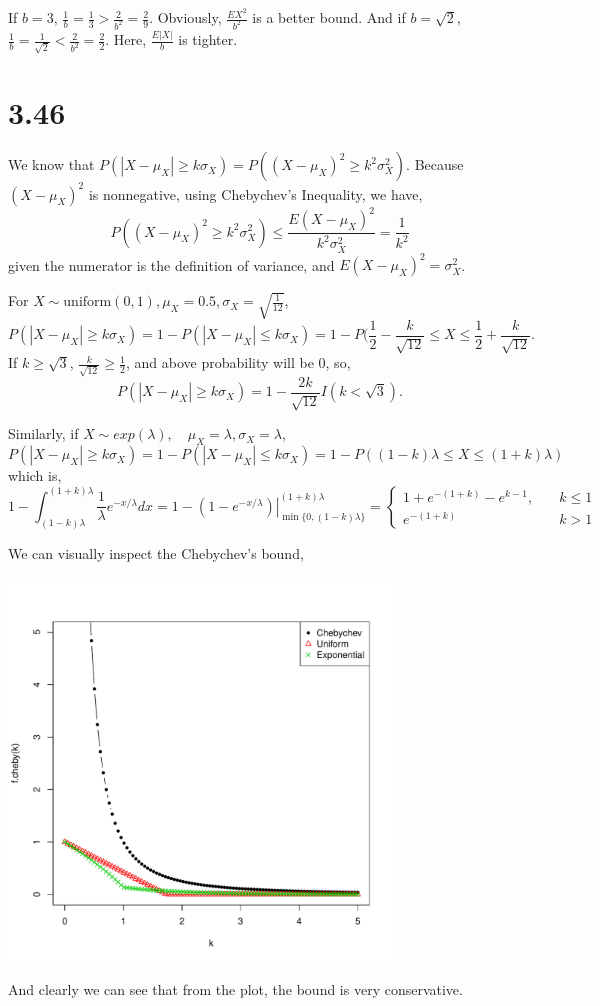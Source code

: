 \documentclass[letterpaper]{article}
\begin{document}
   If $b=3$, $\frac{1}{b} = \frac{1}{3} > \frac{2}{b^2} = \frac{2}{9}$. Obviously, $\frac{EX^2}{b^2}$ is a better bound. And if $b = \sqrt{2}$, $\frac{1}{b} = \frac{1}{\sqrt{2}} < \frac{2}{b^2} = \frac{2}{2}$. Here, $\frac{E|X|}{b}$ is tighter.

   \section*{3.46}
    We know that $P(|X-\mu_X| \ge k\sigma_X) = P\left((X-\mu_X)^2 \ge k^2 \sigma_X^2\right)$. Because $(X-\mu_X)^2$ is nonnegative, using Chebychev's Inequality, we have,
    \[
    P\left((X-\mu_X)^2 \ge k^2 \sigma_X^2\right) \le \frac{E(X-\mu_X)^2}{k^2 \sigma_X^2} = \frac{1}{k^2}
    \]
    given the numerator is the definition of variance, and $E(X - \mu_X)^2 = \sigma_X^2$.

    For $X \sim \text{uniform}(0, 1), \mu_X = 0.5, \sigma_X = \sqrt{\frac{1}{12}}$, 
    \[
    P(|X-\mu_X| \ge k\sigma_X) = 1 - P(|X - \mu_X| \le k\sigma_X) = 1 - P(\frac{1}{2}-\frac{k}{\sqrt{12}} \le X \le \frac{1}{2} + \frac{k}{\sqrt{12}}.
    \]
    If $k \ge \sqrt{3}$, $\frac{k}{\sqrt{12}} \ge \frac{1}{2}$, and above probability will be 0, so,
    \[
    P(|X-\mu_X| \ge k\sigma_X) = 1-\frac{2k}{\sqrt{12}} I(k < \sqrt{3}).
    \]

    Similarly, if $X \sim exp(\lambda), \quad \mu_X = \lambda, \sigma_X = \lambda$, 
    \[
    P(|X-\mu_X| \ge k\sigma_X) = 1 - P(|X - \mu_X| \le k\sigma_X) = 1-P((1-k)\lambda \le X \le (1+k)\lambda)
    \]
    which is,
    \[
    1- \int_{(1-k)\lambda}^{(1+k)\lambda} \frac{1}{\lambda} e^{-x/\lambda} dx = 1-\left.\left( 1-e^{-x/\lambda} \right)\right|^{(1+k)\lambda}_{\min\{0, (1-k)\lambda\}} = 
    \begin{cases}
    1+e^{-(1+k)}-e^{k-1}, \quad & k \le 1 \\
    e^{-(1+k)} \quad & k > 1
    \end{cases}
    \]

    We can visually inspect the Chebychev's bound,
    
    \begin{center}
    \includegraphics[width=4in]{chebychev.pdf}
    \end{center}

    And clearly we can see that from the plot, the bound is very conservative. 
\end{document}
